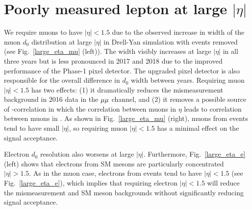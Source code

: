 \chapter{Poorly measured lepton \ad at large $|\eta|$}
\label{large_eta}

We require muons to have $|\eta|<1.5$ due to the observed increase in width of the muon $d_0$ distribution at large $|\eta|$ in Drell-Yan simulation with \ztautaull events removed (see Fig.~\ref{large_eta_mu} (left)). The width visibly increases at large $|\eta|$ in all three years but is less pronounced in 2017 and 2018 due to the improved performance of the Phase-1 pixel detector. The upgraded pixel detector is also responsible for the overall difference in $d_0$ width between years. Requiring muon $|\eta|< 1.5$ has two effects: (1) it dramatically reduces the mismeasurement background in 2016 data in the ${\mu}{\mu}$ channel, and (2) it removes a possible source of \ada-\adb correlation in which the correlation between muons in $\eta$ leads to correlation between muons in \ad. As shown in Fig.~\ref{large_eta_mu} (right), muons from \stoptolb events tend to have small $|\eta|$, so requiring muon $|\eta|< 1.5$ has a minimal effect on the signal acceptance.



Electron $d_0$ resolution also worsens at large $|\eta|$. Furthermore, Fig.~\ref{large_eta_e} (left) shows that electrons from SM mesons are particularly concentrated $|\eta|>1.5$. As in the muon case, electrons from \stoptolb events tend to have $|\eta|<1.5$ (see Fig.~\ref{large_eta_e}), which implies that requiring electron $|\eta|<1.5$ will reduce the mismeasurement and SM meson backgrounds without significantly reducing signal acceptance.



\pagebreak